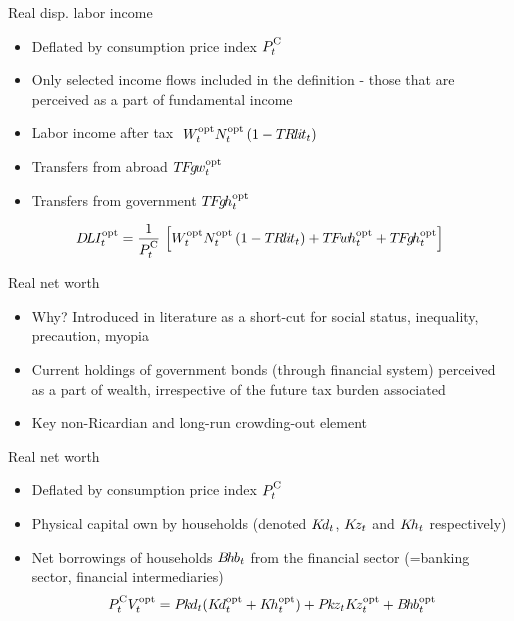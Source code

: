 \begin{frame}{Real disp. labor income}
  \begin{itemize}
    \item Deflated by consumption price index $P^\cc_t$
    \item Only selected income flows included in the definition - those that are perceived as a part of fundamental income
    \item Labor income after tax $\ W_t^{\text{opt}} N_t^{\text{opt}}\left(1- T\hspace{-0.1em}R\hspace{-0.075em}l\hspace{-0.075em}i\hspace{-0.075em}t_t\right)$
    \item Transfers from abroad $T\hspace{-0.125em}F\hspace{-0.15em}g\hspace{-0.15em}w^{\text{opt}}_t$
    \item Transfers from government $T\hspace{-0.125em}F\hspace{-0.15em}g\hspace{-0.15em}h^{\text{opt}}_t$
  \end{itemize} 
  \vspace{-5mm}
  {\small
  \begin{gather*}
    \DLI_t^\opt  = \frac{1}{P^\cc_t}\,\left[W_t^{\opt} N_t^{\opt}\left(1- \TRlit_t\right) +\TFwh^{\opt}_t + \TFgh^{\opt}_t\right]
  \end{gather*}
  }%
\end{frame}

\stopframecont

\startframecont  

\begin{frame}{Real net worth}
  \begin{itemize}
    \item Why? Introduced in literature as a short-cut for social status, inequality, precaution, myopia
    \item Current holdings of government bonds (through financial system) perceived as a part of wealth, irrespective of the future tax burden associated
    \item Key non-Ricardian and long-run crowding-out element
  \end{itemize} 
\end{frame}

\begin{frame}{Real net worth}
  \vspace{-10mm}
  \begin{itemize}
    \item Deflated by consumption price index $P^\cc_t$
    \item Physical capital own by households (denoted $K\hspace{-0.15em}d_t$, $K\hspace{-0.15em}z_t$ and $K\hspace{-0.15em}h_t$ respectively)
    \item Net borrowings of households $B\hspace{-0.15em}h\hspace{-0.075em}b_t$ from the financial sector (=banking sector, financial intermediaries)
    \small
    \begin{gather*}
      P^\cc_t V_t^\opt  = \Pkd_t (\Kd_t^{\opt}+\Kh_t^{\opt})+ \Pkz_t \Kz_t^{\opt} + \Bhb_t^{\opt}
    \end{gather*}
  \end{itemize} 
\end{frame}

